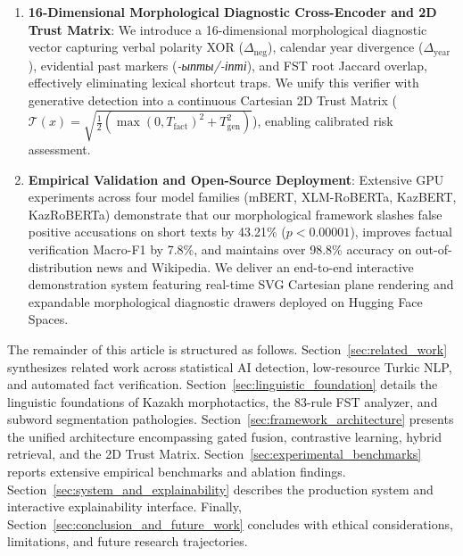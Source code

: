 \begin{enumerate}
    \item \textbf{16-Dimensional Morphological Diagnostic Cross-Encoder and 2D Trust Matrix}: We introduce a 16-dimensional morphological diagnostic vector capturing verbal polarity XOR ($\Delta_{\text{neg}}$), calendar year divergence ($\Delta_{\text{year}}$), evidential past markers (\textit{-ыпты/-іпті}), and FST root Jaccard overlap, effectively eliminating lexical shortcut traps. We unify this verifier with generative detection into a continuous Cartesian 2D Trust Matrix ($\mathcal{T}(x) = \sqrt{\frac{1}{2}(\max(0, T_{\text{fact}})^2 + T_{\text{gen}}^2)}$), enabling calibrated risk assessment.
    \item \textbf{Empirical Validation and Open-Source Deployment}: Extensive GPU experiments across four model families (mBERT, XLM-RoBERTa, KazBERT, KazRoBERTa) demonstrate that our morphological framework slashes false positive accusations on short texts by 43.21\% ($p < 0.00001$), improves factual verification Macro-F1 by 7.8\%, and maintains over 98.8\% accuracy on out-of-distribution news and Wikipedia. We deliver an end-to-end interactive demonstration system featuring real-time SVG Cartesian plane rendering and expandable morphological diagnostic drawers deployed on Hugging Face Spaces.
\end{enumerate}

The remainder of this article is structured as follows. Section~\ref{sec:related_work} synthesizes related work across statistical AI detection, low-resource Turkic NLP, and automated fact verification. Section~\ref{sec:linguistic_foundation} details the linguistic foundations of Kazakh morphotactics, the 83-rule FST analyzer, and subword segmentation pathologies. Section~\ref{sec:framework_architecture} presents the unified architecture encompassing gated fusion, contrastive learning, hybrid retrieval, and the 2D Trust Matrix. Section~\ref{sec:experimental_benchmarks} reports extensive empirical benchmarks and ablation findings. Section~\ref{sec:system_and_explainability} describes the production system and interactive explainability interface. Finally, Section~\ref{sec:conclusion_and_future_work} concludes with ethical considerations, limitations, and future research trajectories.
